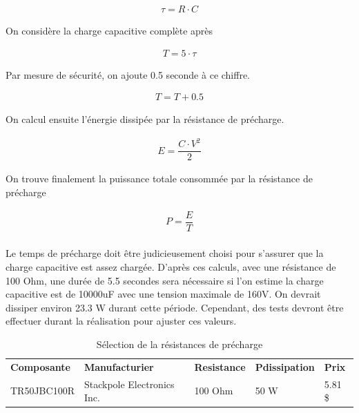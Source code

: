 		\begin{align}
			\tau =R \cdot C
			\label{eq:Constante de temps}
		\end{align}
				
		On considère la charge capacitive complète après	
	 
		\begin{align}
			T = 5 \cdot \tau
			\label{eq:CapaciteCharge}
		\end{align}
		
		Par mesure de sécurité, on ajoute 0.5 seconde à ce chiffre.
		
		\begin{align}
			T = T + 0.5
			\label{eq:Tempsdecharge}
		\end{align}		
				
		On calcul ensuite l'énergie dissipée par la résistance de précharge.
		
		\begin{align}
			E = \dfrac{C \cdot V^2}{2}
			\label{eq:EnergiePrecharge}
		\end{align}
		
		On trouve finalement la puissance totale consommée par la résistance de précharge
	
		\begin{align}
			P = \dfrac{E}{T}
			\label{eq:PuissancePrecharge}
		\end{align}	
			
		\paragraph*{}		
		Le temps de précharge doit être judicieusement choisi pour s'assurer que la charge capacitive est assez chargée. D'après ces calculs, avec une résistance de 100 Ohm, une durée de 5.5 secondes sera nécessaire si l'on estime la charge capacitive est de 10000uF avec une tension maximale de 160V. On devrait dissiper environ 23.3 W durant cette période. Cependant, des tests devront être effectuer durant la réalisation pour ajuster ces valeurs.
				
		\begin{table}[H]
			\centering
			\caption{Sélection de la résistances de précharge}
			\label{ResistancePrecharge}
			\renewcommand{\arraystretch}{1.3}
			\begin{tabular}{|p{3cm}|p{5cm}|p{2cm}|p{2cm}|p{1.5cm}|}
				\hline
				\textbf{Composante} & \textbf{Manufacturier} & \textbf{Resistance} & \textbf{Pdissipation} & \textbf{Prix}
				\\ \hhline{|=|=|=|=|=|}
				TR50JBC100R & Stackpole Electronics Inc. & 100 Ohm & 50 W & 5.81 \$ \\ \hline		
			\end{tabular}
		\end{table}

